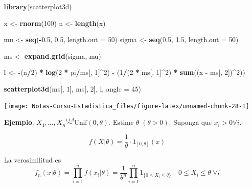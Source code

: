 \documentclass[
  12pt,
]{book}
\newenvironment{Shaded}{\begin{snugshade}}{\end{snugshade}}
\newcommand{\DataTypeTok}[1]{\textcolor[rgb]{0.13,0.29,0.53}{#1}}
\newcommand{\DecValTok}[1]{\textcolor[rgb]{0.00,0.00,0.81}{#1}}
\newcommand{\FloatTok}[1]{\textcolor[rgb]{0.00,0.00,0.81}{#1}}
\newcommand{\KeywordTok}[1]{\textcolor[rgb]{0.13,0.29,0.53}{\textbf{#1}}}
\newcommand{\NormalTok}[1]{#1}
\newcommand{\OperatorTok}[1]{\textcolor[rgb]{0.81,0.36,0.00}{\textbf{#1}}}
\newcommand{\StringTok}[1]{\textcolor[rgb]{0.31,0.60,0.02}{#1}}
\begin{document}
\begin{Shaded}
\begin{Highlighting}[]
\KeywordTok{library}\NormalTok{(scatterplot3d)}

\NormalTok{x \textless{}{-}}\StringTok{ }\KeywordTok{rnorm}\NormalTok{(}\DecValTok{100}\NormalTok{)}
\NormalTok{n \textless{}{-}}\StringTok{ }\KeywordTok{length}\NormalTok{(x)}

\NormalTok{mu \textless{}{-}}\StringTok{ }\KeywordTok{seq}\NormalTok{(}\OperatorTok{{-}}\FloatTok{0.5}\NormalTok{, }\FloatTok{0.5}\NormalTok{, }\DataTypeTok{length.out =} \DecValTok{50}\NormalTok{)}
\NormalTok{sigma \textless{}{-}}\StringTok{ }\KeywordTok{seq}\NormalTok{(}\FloatTok{0.5}\NormalTok{, }\FloatTok{1.5}\NormalTok{, }\DataTypeTok{length.out =} \DecValTok{50}\NormalTok{)}

\NormalTok{ms \textless{}{-}}\StringTok{ }\KeywordTok{expand.grid}\NormalTok{(sigma, mu)}

\NormalTok{l \textless{}{-}}\StringTok{ }\OperatorTok{{-}}\NormalTok{(n}\OperatorTok{/}\DecValTok{2}\NormalTok{) }\OperatorTok{*}\StringTok{ }\KeywordTok{log}\NormalTok{(}\DecValTok{2} \OperatorTok{*}\StringTok{ }\NormalTok{pi}\OperatorTok{/}\NormalTok{ms[, }\DecValTok{1}\NormalTok{]}\OperatorTok{\^{}}\DecValTok{2}\NormalTok{) }\OperatorTok{{-}}\StringTok{ }\NormalTok{(}\DecValTok{1}\OperatorTok{/}\NormalTok{(}\DecValTok{2} \OperatorTok{*}\StringTok{ }\NormalTok{ms[, }
    \DecValTok{1}\NormalTok{]}\OperatorTok{\^{}}\DecValTok{2}\NormalTok{) }\OperatorTok{*}\StringTok{ }\KeywordTok{sum}\NormalTok{((x }\OperatorTok{{-}}\StringTok{ }\NormalTok{ms[, }\DecValTok{2}\NormalTok{])}\OperatorTok{\^{}}\DecValTok{2}\NormalTok{))}

\KeywordTok{scatterplot3d}\NormalTok{(ms[, }\DecValTok{1}\NormalTok{], ms[, }\DecValTok{2}\NormalTok{], l, }\DataTypeTok{angle =} \DecValTok{45}\NormalTok{)}
\end{Highlighting}
\end{Shaded}

\begin{center}\texttt{[image: Notas-Curso-Estadistica\_files/figure-latex/unnamed-chunk-28-1]} \end{center}

\textbf{Ejemplo}. \(X_1,\dots, X_n \stackrel{i.i.d}{\sim} \text{Unif}(0, \theta)\). Estime \(\theta\) \((\theta > 0)\). Suponga que \(x_i>0 \forall i\).

\[f(X|\theta) = \dfrac 1\theta \cdot 1_{[0,\theta]}(x)\]

La verosimilitud es
\[f_n(x|\theta) = \prod_{i=1}^{n} f(x_i|\theta) = \dfrac 1{\theta^n} \prod_{i=1}^n 1_{\{0\leq X_i\leq \theta\}} \quad 0\leq X_i \leq \theta \;\forall i\]
\end{document}
